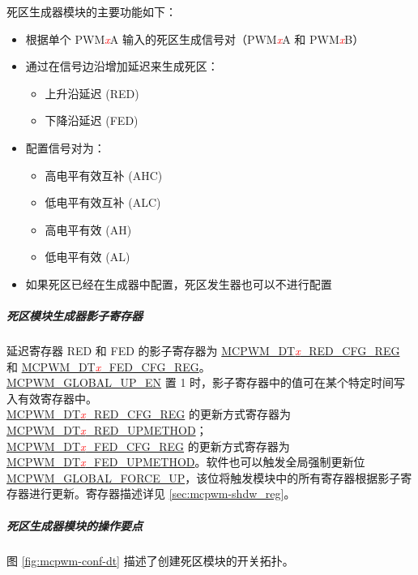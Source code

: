 \documentclass[main\_\_CN.tex]{subfiles}
\begin{document}
死区生成器模块的主要功能如下：
\begin{itemize}
    \item 根据单个 PWM\textcolor{red}{\it{x}}A 输入的死区生成信号对（PWM\textcolor{red}{\it{x}}A 和 PWM\textcolor{red}{\it{x}}B）
    \item 通过在信号边沿增加延迟来生成死区：
    \begin{itemize}
        \item 上升沿延迟 (RED) 
        \item 下降沿延迟 (FED) 
    \end{itemize}
    \item 配置信号对为：
    \begin{itemize}
        \item 高电平有效互补 (AHC) 
        \item 低电平有效互补 (ALC) 
        \item 高电平有效 (AH) 
        \item 低电平有效 (AL) 
    \end{itemize}
    \item 如果死区已经在生成器中配置，死区发生器也可以不进行配置

\end{itemize}

\subparagraph{死区模块生成器影子寄存器}

延迟寄存器 RED 和 FED 的影子寄存器为 \hyperref[regdesc:MCPWMDT0REDCFGREG]{MCPWM\_DT\textcolor{red}{\it{x}}\_RED\_CFG\_REG} 和 \hyperref[regdesc:MCPWMDT0FEDCFGREG]{MCPWM\_DT\textcolor{red}{\it{x}}\_FED\_CFG\_REG}。\\\hyperref[fielddesc:MCPWMGLOBALUPEN]{MCPWM\_GLOBAL\_UP\_EN} 置 1 时，影子寄存器中的值可在某个特定时间写入有效寄存器中。\\\hyperref[regdesc:MCPWMDT0REDCFGREG]{MCPWM\_DT\textcolor{red}{\it{x}}\_RED\_CFG\_REG} 的更新方式寄存器为 \hyperref[fielddesc:MCPWMDT0REDUPMETHOD]{MCPWM\_DT\textcolor{red}{\it{x}}\_RED\_UPMETHOD}； \\\hyperref[regdesc:MCPWMDT0FEDCFGREG]{MCPWM\_DT\textcolor{red}{\it{x}}\_FED\_CFG\_REG} 的更新方式寄存器为 \hyperref[fielddesc:MCPWMDT0FEDUPMETHOD]{MCPWM\_DT\textcolor{red}{\it{x}}\_FED\_UPMETHOD}。软件也可以触发全局强制更新位 \hyperref[fielddesc:MCPWMGLOBALFORCEUP]{MCPWM\_GLOBAL\_FORCE\_UP}，该位将触发模块中的所有寄存器根据影子寄存器进行更新。寄存器描述详见 \ref{sec:mcpwm-shdw_reg}。

\clearpage
\subparagraph{死区生成器模块的操作要点}
 图 \ref{fig:mcpwm-conf-dt} 描述了创建死区模块的开关拓扑。
\end{document}
